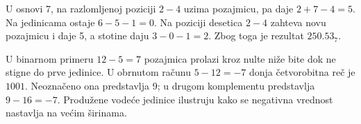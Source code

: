 U osnovi 7, na razlomljenoj poziciji $2-4$ uzima pozajmicu, pa daje $2+7-4=5$. Na jedinicama ostaje $6-5-1=0$. Na poziciji desetica $2-4$ zahteva novu pozajmicu i daje 5, a stotine daju $3-0-1=2$. Zbog toga je rezultat $250.53_7$.

U binarnom primeru $12-5=7$ pozajmica prolazi kroz nulte niže bite dok ne stigne do prve jedinice. U obrnutom računu $5-12=-7$ donja četvorobitna reč je $1001$. Neoznačeno ona predstavlja 9; u drugom komplementu predstavlja $9-16=-7$. Produžene vodeće jedinice ilustruju kako se negativna vrednost nastavlja na većim širinama.
